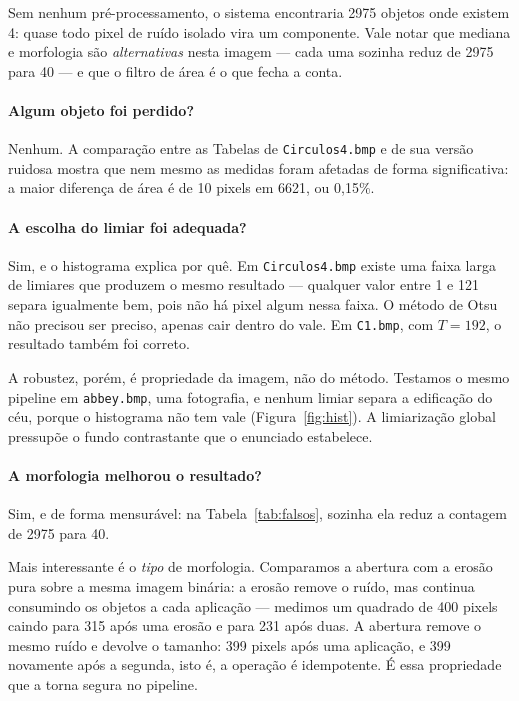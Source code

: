 \documentclass[12pt,a4paper]{article}
\begin{document}
Sem nenhum pré-processamento, o sistema encontraria 2975 objetos onde existem
4: quase todo pixel de ruído isolado vira um componente. Vale notar que
mediana e morfologia são \emph{alternativas} nesta imagem --- cada uma sozinha
reduz de 2975 para 40 --- e que o filtro de área é o que fecha a conta.

\paragraph{Algum objeto foi perdido?} Nenhum. A comparação entre as
Tabelas de \texttt{Circulos4.bmp} e de sua versão ruidosa mostra que nem
mesmo as medidas foram afetadas de forma significativa: a maior diferença de
área é de 10 pixels em 6621, ou 0,15\%.

\paragraph{A escolha do limiar foi adequada?} Sim, e o histograma explica por
quê. Em \texttt{Circulos4.bmp} existe uma faixa larga de limiares que produzem
o mesmo resultado --- qualquer valor entre 1 e 121 separa igualmente bem, pois
não há pixel algum nessa faixa. O método de Otsu não precisou ser preciso,
apenas cair dentro do vale. Em \texttt{C1.bmp}, com $T = 192$, o resultado
também foi correto.

A robustez, porém, é propriedade da imagem, não do método. Testamos o mesmo
pipeline em \texttt{abbey.bmp}, uma fotografia, e nenhum limiar separa a
edificação do céu, porque o histograma não tem vale (Figura~\ref{fig:hist}).
A limiarização global pressupõe o fundo contrastante que o enunciado
estabelece.

\paragraph{A morfologia melhorou o resultado?} Sim, e de forma mensurável: na
Tabela~\ref{tab:falsos}, sozinha ela reduz a contagem de 2975 para 40.

Mais interessante é o \emph{tipo} de morfologia. Comparamos a abertura com a
erosão pura sobre a mesma imagem binária: a erosão remove o ruído, mas
continua consumindo os objetos a cada aplicação --- medimos um quadrado de 400
pixels caindo para 315 após uma erosão e para 231 após duas. A abertura remove
o mesmo ruído e devolve o tamanho: 399 pixels após uma aplicação, e 399
novamente após a segunda, isto é, a operação é idempotente. É essa propriedade
que a torna segura no pipeline.
\end{document}
